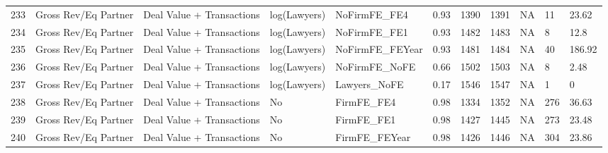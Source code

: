 \documentclass{article}
\begin{document}
\begin{table}[H]
\begin{tabular}{rllllllllll}
  233 & Gross Rev/Eq Partner & Deal Value + Transactions & log(Lawyers) & NoFirmFE\_FE4 & 0.93 & 1390 & 1391 & NA & 11 & 23.62 \\ 
  234 & Gross Rev/Eq Partner & Deal Value + Transactions & log(Lawyers) & NoFirmFE\_FE1 & 0.93 & 1482 & 1483 & NA & 8 & 12.8 \\ 
  235 & Gross Rev/Eq Partner & Deal Value + Transactions & log(Lawyers) & NoFirmFE\_FEYear & 0.93 & 1481 & 1484 & NA & 40 & 186.92 \\ 
  236 & Gross Rev/Eq Partner & Deal Value + Transactions & log(Lawyers) & NoFirmFE\_NoFE & 0.66 & 1502 & 1503 & NA & 8 & 2.48 \\ 
  237 & Gross Rev/Eq Partner & Deal Value + Transactions & log(Lawyers) & Lawyers\_NoFE & 0.17 & 1546 & 1547 & NA & 1 & 0 \\ 
  238 & Gross Rev/Eq Partner & Deal Value + Transactions & No & FirmFE\_FE4 & 0.98 & 1334 & 1352 & NA & 276 & 36.63 \\ 
  239 & Gross Rev/Eq Partner & Deal Value + Transactions & No & FirmFE\_FE1 & 0.98 & 1427 & 1445 & NA & 273 & 23.48 \\ 
  240 & Gross Rev/Eq Partner & Deal Value + Transactions & No & FirmFE\_FEYear & 0.98 & 1426 & 1446 & NA & 304 & 23.86 \\ 
   \hline
\end{tabular}
\end{table}
\end{document}
